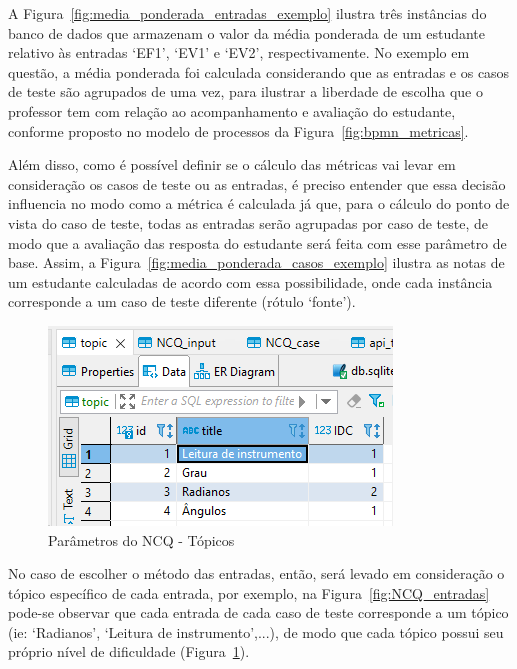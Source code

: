 A Figura~\ref{fig:media_ponderada_entradas_exemplo} ilustra três instâncias do banco de dados que armazenam o valor da média ponderada de um estudante relativo às entradas `EF1', `EV1' e `EV2', respectivamente. No exemplo em questão, a média ponderada foi calculada considerando que as entradas e os casos de teste são agrupados de uma vez, para ilustrar a liberdade de escolha que o professor tem com relação ao acompanhamento e avaliação do estudante, conforme proposto no modelo de processos da Figura~\ref{fig:bpmn_metricas}. 


Além disso, como é possível definir se o cálculo das métricas vai levar em consideração os casos de teste ou as entradas, é preciso entender que essa decisão influencia no modo como a métrica é calculada já que, para o cálculo do ponto de vista do caso de teste, todas as entradas serão agrupadas por caso de teste, de modo que a avaliação das resposta do estudante será feita com esse parâmetro de base. Assim, a Figura~\ref{fig:media_ponderada_casos_exemplo} ilustra as notas de um estudante calculadas de acordo com essa possibilidade, onde cada instância corresponde a um caso de teste diferente (rótulo `fonte').

\begin{figure}[htb]
	\centering
	\includegraphics[width=0.5\linewidth]{chapters/proposedMethod/tools/NCQ_topicos.png}
	\caption{Parâmetros do NCQ - Tópicos}
	\label{fig:NCQ_topicos}
\end{figure}

No caso de escolher o método das entradas, então, será levado em consideração o tópico específico de cada entrada, por exemplo, na Figura~\ref{fig:NCQ_entradas} pode-se observar que cada entrada de cada caso de teste corresponde a um tópico (ie: `Radianos', `Leitura de instrumento',...), de modo que cada tópico possui seu próprio nível de dificuldade (Figura~\ref{fig:NCQ_topicos}).

